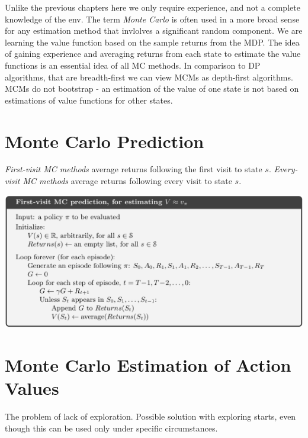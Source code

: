 Unlike the previous chapters here we only require experience, and not a complete knowledge of the env.
The term \textit{Monte Carlo} is often used in a more broad sense for any estimation method that
invlolves a significant random component.
We are learning the value function based on the sample returns from the MDP.
The idea of gaining experience and averaging returns from each state to estimate the value functions
is an essential idea of all MC methods.
In comparison to DP algorithms, that are breadth-first we can view MCMs as depth-first
algorithms.
MCMs do not bootstrap - an estimation of the value of one state is not based on estimations
of value functions for other states.

\section{Monte Carlo Prediction}
\textit{First-visit MC methods} average returns following the first visit to state $s$.
\textit{Every-visit MC methods} average returns following every visit to state $s$.
\begin{center}
    \includegraphics[width=\textwidth]{img/first_visit_MCM.png}
\end{center}

\section{Monte Carlo Estimation of Action Values}
The problem of lack of exploration.
Possible solution with exploring starts, even though this can be used only under specific
circumstances.

